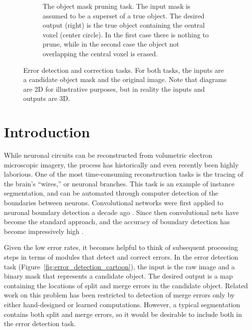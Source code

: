 \documentclass{article}
\begin{document}
\begin{figure}[t!]
\begin{center}
\begin{subfigure}[t]{0.45\textwidth}
	\caption{The object mask pruning task. The input mask is assumed to be a superset of a true object. The desired output (right) is the true object containing the central voxel (center circle). In the first case there is nothing to prune, while in the second case the object not overlapping the central voxel is erased.}
	\label{fig:error_correction_cartoon}
\end{subfigure}
        \end{center}
        \caption{Error detection and correction tasks.  For both tasks, the inputs are a candidate object mask and the original image. Note that diagrams are 2D for illustrative purposes, but in reality the inputs and outputs are 3D.}
\end{figure}

\section{Introduction}

While neuronal circuits can be reconstructed from volumetric electron
microscopic imagery, the process has historically \cite{white1986structure} and
even recently \cite{schmidt2017axonal} been highly laborious. One of the most
time-consuming reconstruction tasks is the tracing of the brain's ``wires,'' or
neuronal branches. This task is an example of instance segmentation, and can be
automated through computer detection of the boundaries between neurons.
Convolutional networks were first applied to neuronal boundary detection a
decade ago \cite{jain2007supervised, boundary_detection}. Since then
convolutional nets have become the standard approach, and the accuracy of
boundary detection has become impressively high  \cite{zeng2017deep,
beier2017multicut, kisuk, funke2017deep}.

Given the low error rates, it becomes helpful to think of subsequent processing steps in terms of modules that detect and correct errors. In the error detection task (Figure~\ref{fig:error_detection_cartoon}), the input is the raw image and a binary mask that represents a candidate object. The desired output is a map containing the locations of split and merge errors in the candidate object. Related work on this problem has been restricted to detection of merge errors only by either hand-designed \cite{multipass} or learned \cite{mergenet} computations. However, a typical segmentation contains both split and merge errors, so it would be desirable to include both in the error detection task.
\end{document}
